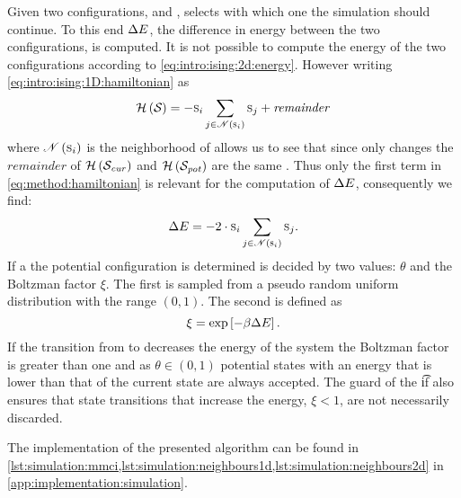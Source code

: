 Given two configurations,  and ,  selects with which one the simulation should continue. To this end $\Delta E$, the difference in energy between the two configurations, is computed. It is not possible to compute the energy of the two configurations according to \cref{eq:intro:ising:2d:energy}. However writing \cref{eq:intro:ising:1D:hamiltonian} as
	\begin{equation}\label{eq:method:hamiltonian}
			\mathcal{H}\left(\mathcal{S}_{}\right) = - \textsc{s}_{i} \sum_{j \in \mathscr{N}\left(\textsc{s}_{i}\right)} \textsc{s}_{j} + \mathit{remainder}
	\end{equation}
where $\mathscr{N}\left(\textsc{s}_{i}\right)$ is the neighborhood of  allows us to see that since only  changes the $\mathit{remainder}$ of $\mathcal{H}\left(\mathcal{S}_{\mathit{cur}}\right)$ and $\mathcal{H}\left(\mathcal{S}_{\mathit{pot}}\right)$ are the same \cite{kenzel1997physics}. Thus only the first term in \cref{eq:method:hamiltonian} is relevant for the computation of $\Delta E$, consequently we find:
\begin{equation}\label{eq:method:deltaEnergy}
	\Delta E = - 2 \cdot \textsc{s}_{i} \sum_{j \in \mathscr{N}\left(\textsc{s}_{i}\right)} \textsc{s}_{j}.
\end{equation}
If a the potential configuration is determined is decided by two values: $\theta$ and the Boltzman factor $\xi$. The first is sampled from a pseudo random uniform distribution with the range $\left(0, 1\right)$. The second is defined as
\begin{equation}
	\xi = \exp\left[- \beta\Delta E \right].
\end{equation}
If the transition from  to  decreases the energy of the system the Boltzman factor is greater than one and as \mbox{$\theta \in \left(0, 1\right)$} potential states with an energy that is lower than that of the current state are always accepted. The guard of the \t{if} also ensures that state transitions that increase the energy, \ie \mbox{$\xi < 1$}, are not necessarily discarded.

The implementation of the presented algorithm can be found in \cref{lst:simulation:mmci,lst:simulation:neighbours1d,lst:simulation:neighbours2d} in \cref{app:implementation:simulation}.